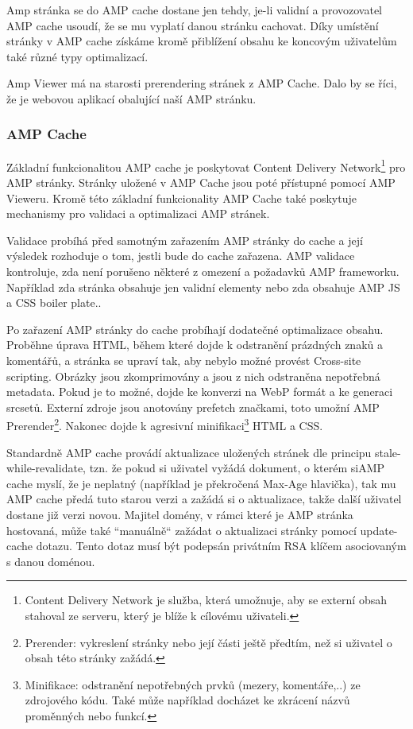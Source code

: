 Amp stránka se do AMP cache dostane jen tehdy, je-li validní a provozovatel AMP cache usoudí, že se mu vyplatí danou stránku cachovat. Díky umístění stránky v AMP cache získáme kromě přiblížení obsahu ke koncovým uživatelům také různé typy optimalizací.

Amp Viewer má na starosti prerendering stránek z AMP Cache. Dalo by se říci, že je webovou aplikací obalující naší AMP stránku. 

\subsubsection*{AMP Cache}
Základní funkcionalitou AMP cache je poskytovat Content Delivery Network\footnote{Content Delivery Network je služba, která umožnuje, aby se externí obsah stahoval ze serveru, který je blíže k cílovému uživateli.} pro AMP stránky. Stránky uložené v AMP Cache jsou poté přístupné pomocí AMP Vieweru.
Kromě této základní funkcionality AMP Cache také poskytuje mechanismy pro validaci a optimalizaci AMP stránek.

Validace probíhá před samotným zařazením AMP stránky do cache a její výsledek rozhoduje o tom, jestli bude do cache zařazena.
AMP validace kontroluje, zda není porušeno některé z omezení a požadavků AMP frameworku. Například zda stránka obsahuje jen validní elementy nebo zda obsahuje AMP JS a CSS boiler plate.\cite{AMPCache}.

Po zařazení AMP stránky do cache probíhají dodatečné optimalizace obsahu.
Proběhne úprava HTML, během které dojde k odstranění prázdných znaků a komentářů, a stránka se upraví tak, aby nebylo možné provést Cross-site scripting\cite{whyAMPCache}.
Obrázky jsou zkomprimovány a jsou z nich odstraněna nepotřebná metadata. Pokud je to možné, dojde ke konverzi na WebP formát a ke generaci srcsetů.
Externí zdroje jsou anotovány prefetch značkami, toto umožní AMP Prerender\footnote{Prerender: vykreslení stránky nebo její části ještě předtím, než si uživatel o obsah této stránky zažádá.}.
Nakonec dojde k agresivní minifikaci\footnote{Minifikace: odstranění nepotřebných prvků (mezery, komentáře,..) ze zdrojového kódu. Také může například docházet ke zkrácení názvů proměnných nebo funkcí.} HTML a CSS.

Standardně AMP cache provádí aktualizace uložených stránek dle principu stale-while-revalidate, tzn. že pokud si uživatel vyžádá dokument, o kterém siAMP cache myslí, že je neplatný (například  je překročená Max-Age hlavička), tak mu AMP cache předá tuto starou verzi a zažádá si o aktualizace, takže další uživatel dostane již verzi novou\cite{AMPUpdate}.
Majitel domény, v rámci které je AMP stránka hostovaná, může také “manuálně“ zažádat o aktualizaci stránky pomocí update-cache dotazu. Tento dotaz musí být podepsán privátním RSA klíčem asociovaným s danou doménou\cite{AMPUpdateUrl}.

